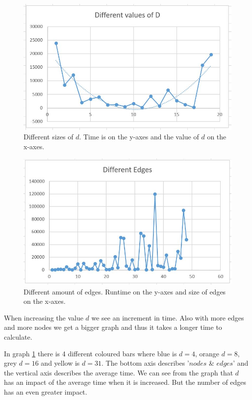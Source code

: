 \documentclass[paper=a4, fontsize=11pt]{scrartcl}
\numberwithin{equation}{section}		%
\numberwithin{figure}{section}			%
\numberwithin{table}{section}				%
\begin{document}
\begin{figure}
  \includegraphics[width=\linewidth]{d.jpg}
  \caption{Different sizes of $d$. Time is on the y-axes and the value of $d$ on the x-axes.}
  \label{fig:result}
\end{figure}

\begin{figure}
  \includegraphics[width=\linewidth]{edge.jpg}
  \caption{Different amount of edges. Runtime on the y-axes and size of edges on the x-axes.}
  \label{fig:result2}
\end{figure}

When increasing the value $d$ we see an increment in time.
Also with more edges and more nodes we get a bigger graph and thus it takes a longer time to calculate.

In graph \ref{fig:result} there is 4 different coloured bars where blue is $d=4$, orange $d=8$, grey $d=16$ and yellow is $d=31$. The bottom axis describes '$nodes$ \& $edges$' and the vertical axis describes the average time. We can see from the graph that $d$ has an impact of the average time when it is increased. But the number of edges has an even greater impact.
\end{document}
